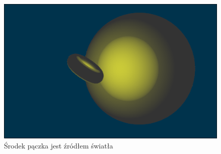 \documentclass[11pt]{article}
\begin{document}
\begin{figure}[htbp]
\centering
\includegraphics[width=.9\linewidth]{img/test16.png}
\caption{Środek pączka jest źródłem światła}
\end{figure}
\end{document}
